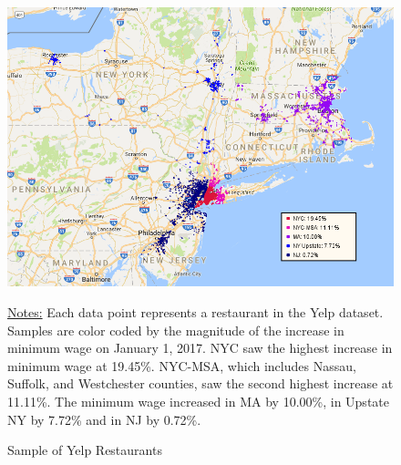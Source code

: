 \documentclass[11pt]{article}
\begin{document}
\begin{figure}[H]
\centering
\caption{Sample of Yelp Restaurants}
\includegraphics[width=6in]{full_yelp_map.png}

{\footnotesize \raggedright \underline{Notes:} Each data point represents a restaurant in the Yelp dataset. Samples are color coded by the magnitude of the increase in minimum wage on January 1, 2017. NYC saw the highest increase in minimum wage at 19.45\%. NYC-MSA, which includes Nassau, Suffolk, and Westchester counties, saw the second highest increase at 11.11\%. The minimum wage increased in MA by 10.00\%, in Upstate NY by 7.72\% and in NJ by 0.72\%. \par}
\end{figure}

\vspace*{\fill}


\newpage

\vspace*{\fill}
\end{document}

